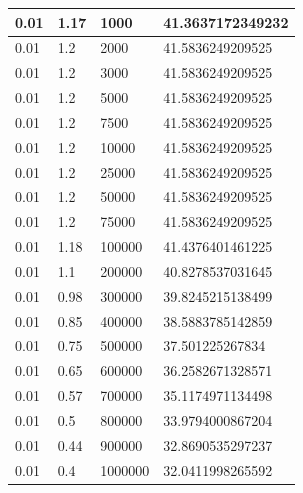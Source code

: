 \documentclass[10pt, a4j, dvipdfmx]{jarticle}
\begin{document}
\begin{table}[H]
\begin{tabular}{|l|l|l|l|}
        0.01     & 1.17     & 1000            & 41.3637172349232           \\ \hline
        0.01     & 1.2      & 2000            & 41.5836249209525           \\ \hline
        0.01     & 1.2      & 3000            & 41.5836249209525           \\ \hline
        0.01     & 1.2      & 5000            & 41.5836249209525           \\ \hline
        0.01     & 1.2      & 7500            & 41.5836249209525           \\ \hline
        0.01     & 1.2      & 10000           & 41.5836249209525           \\ \hline
        0.01     & 1.2      & 25000           & 41.5836249209525           \\ \hline
        0.01     & 1.2      & 50000           & 41.5836249209525           \\ \hline
        0.01     & 1.2      & 75000           & 41.5836249209525           \\ \hline
        0.01     & 1.18     & 100000          & 41.4376401461225           \\ \hline
        0.01     & 1.1      & 200000          & 40.8278537031645           \\ \hline
        0.01     & 0.98     & 300000          & 39.8245215138499           \\ \hline
        0.01     & 0.85     & 400000          & 38.5883785142859           \\ \hline
        0.01     & 0.75     & 500000          & 37.501225267834            \\ \hline
        0.01     & 0.65     & 600000          & 36.2582671328571           \\ \hline
        0.01     & 0.57     & 700000          & 35.1174971134498           \\ \hline
        0.01     & 0.5      & 800000          & 33.9794000867204           \\ \hline
        0.01     & 0.44     & 900000          & 32.8690535297237           \\ \hline
        0.01     & 0.4      & 1000000         & 32.0411998265592           \\ \hline
        \end{tabular}
        \normalsize
    \end{table}
\end{document}
